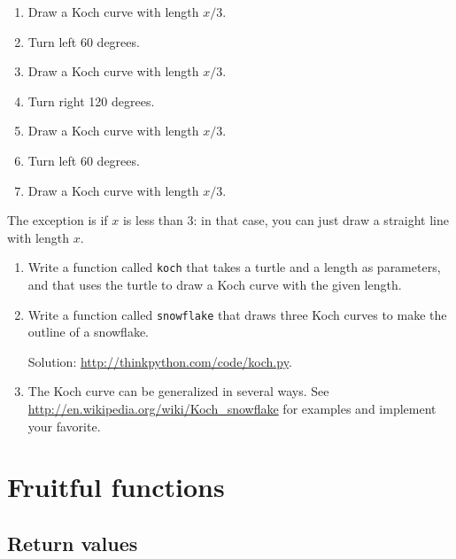 \documentclass[10pt]{book}
\begin{document}
\begin{CJK}{UTF8}{gbsn}
\begin{exercise}
\begin{enumerate}

\item Draw a Koch curve with length $x/3$.

\item Turn left 60 degrees.

\item Draw a Koch curve with length $x/3$.

\item Turn right 120 degrees.

\item Draw a Koch curve with length $x/3$.

\item Turn left 60 degrees.

\item Draw a Koch curve with length $x/3$.

\end{enumerate}

The exception is if $x$ is less than 3: in that case,
you can just draw a straight line with length $x$.

\begin{enumerate}

\item Write a function called {\tt koch} that takes a turtle and
a length as parameters, and that uses the turtle to draw a Koch
curve with the given length.

\item Write a function called {\tt snowflake} that draws three
Koch curves to make the outline of a snowflake.

Solution: \url{http://thinkpython.com/code/koch.py}.

\item The Koch curve can be generalized in several ways.  See
\url{http://en.wikipedia.org/wiki/Koch_snowflake} for examples and
implement your favorite.

\end{enumerate}
\end{exercise}


\chapter{Fruitful functions}
\label{fruitchap}

\section{Return values}


\end{CJK}
\end{document}
